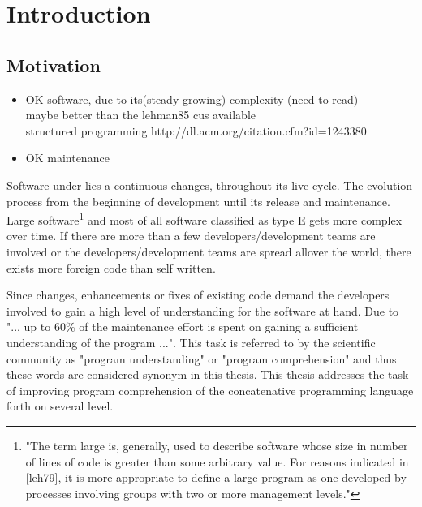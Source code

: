 

\chapter{Introduction}

\section{Motivation}

\begin{itemize}

\item OK software, due to its(steady growing) complexity \cite{Lehman:1985:PEP:7261}(need to read) \\ maybe better than the lehman85 cus available \cite{Lehman:2003:SEB:950401.950407} \\ structured programming http://dl.acm.org/citation.cfm?id=1243380

\item OK maintenance \cite{Lientz:1980:SMM:601062} \cite{ISOSWMaintainance} 
\end{itemize}

Software under lies a continuous changes, throughout its live cycle.
The evolution process from the beginning of development until its release and maintenance. Large software\footnote{"The term large is, generally, used to describe software whose size in number of lines of code is greater than some arbitrary value. For reasons indicated in [leh79], it is more appropriate to define a large program as one developed by processes involving groups with two or more management levels."\cite{Lehman:2003:SEB:950401.950407}} and most of all software  classified as type E \cite{Cook:2006:ESS:1115566.1115567} gets more complex over time. If there are more than a few developers/development teams are involved or the developers/development teams are spread allover the world, there exists more foreign code than self written.

Since changes, enhancements or fixes of existing code demand the developers involved to gain a high level of understanding for the software at hand\cite{Boehm:1976:SE:1311958.1312684}\cite{Singer97anexamination}. Due to \cite{Cornelissen:2009:SSP:1638616.1639301} "... up to 60\% of the maintenance effort is spent on gaining a sufficient understanding of the program ...". This task is referred to by the scientific community as "program understanding" or "program comprehension" and thus these words are considered synonym in this thesis. This thesis addresses the task of improving program comprehension of the concatenative programming language forth on several level.

